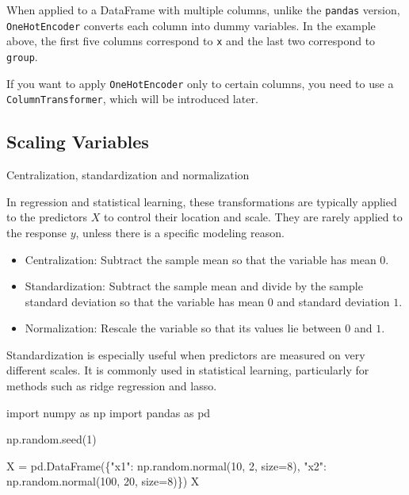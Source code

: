 \documentclass[
  letterpaper,
  DIV=11,
  numbers=noendperiod]{scrreprt}
\newenvironment{Shaded}{\begin{snugshade}}{\end{snugshade}}
\newcommand{\DecValTok}[1]{\textcolor[rgb]{0.68,0.00,0.00}{#1}}
\newcommand{\ImportTok}[1]{\textcolor[rgb]{0.00,0.46,0.62}{#1}}
\newcommand{\NormalTok}[1]{\textcolor[rgb]{0.00,0.23,0.31}{#1}}
\newcommand{\OperatorTok}[1]{\textcolor[rgb]{0.37,0.37,0.37}{#1}}
\newcommand{\StringTok}[1]{\textcolor[rgb]{0.13,0.47,0.30}{#1}}
\providecommand{\tightlist}{%
  \setlength{\itemsep}{0pt}\setlength{\parskip}{0pt}}
\theoremstyle{definition}
\theoremstyle{definition}
\theoremstyle{plain}
\theoremstyle{plain}
\theoremstyle{remark}
\begin{document}
When applied to a DataFrame with multiple columns, unlike the
\texttt{pandas} version, \texttt{OneHotEncoder} converts each column
into dummy variables. In the example above, the first five columns
correspond to \texttt{x} and the last two correspond to \texttt{group}.

If you want to apply \texttt{OneHotEncoder} only to certain columns, you
need to use a \texttt{ColumnTransformer}, which will be introduced
later.

\subsection{Scaling Variables}\label{sec-scaling}

Centralization, standardization and normalization

In regression and statistical learning, these transformations are
typically applied to the predictors \(X\) to control their location and
scale. They are rarely applied to the response \(y\), unless there is a
specific modeling reason.

\begin{itemize}
\tightlist
\item
  Centralization: Subtract the sample mean so that the variable has mean
  \(0\).
\item
  Standardization: Subtract the sample mean and divide by the sample
  standard deviation so that the variable has mean \(0\) and standard
  deviation \(1\).
\item
  Normalization: Rescale the variable so that its values lie between
  \(0\) and \(1\).
\end{itemize}

Standardization is especially useful when predictors are measured on
very different scales. It is commonly used in statistical learning,
particularly for methods such as ridge regression and lasso.

\begin{Shaded}
\begin{Highlighting}[]
\ImportTok{import}\NormalTok{ numpy }\ImportTok{as}\NormalTok{ np}
\ImportTok{import}\NormalTok{ pandas }\ImportTok{as}\NormalTok{ pd}

\NormalTok{np.random.seed(}\DecValTok{1}\NormalTok{)}

\NormalTok{X }\OperatorTok{=}\NormalTok{ pd.DataFrame(\{}\StringTok{"x1"}\NormalTok{: np.random.normal(}\DecValTok{10}\NormalTok{, }\DecValTok{2}\NormalTok{, size}\OperatorTok{=}\DecValTok{8}\NormalTok{), }\StringTok{"x2"}\NormalTok{: np.random.normal(}\DecValTok{100}\NormalTok{, }\DecValTok{20}\NormalTok{, size}\OperatorTok{=}\DecValTok{8}\NormalTok{)\})}
\NormalTok{X}
\end{Highlighting}
\end{Shaded}
\end{document}

